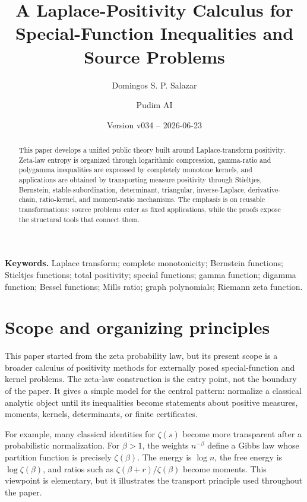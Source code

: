 \documentclass[11pt]{article}
\title{A Laplace-Positivity Calculus for Special-Function Inequalities and Source Problems}
\author{Domingos S. P. Salazar \and Pudim AI}
\date{Version v034 -- 2026-06-23}
\numberwithin{equation}{section}
\theoremstyle{definition}
\theoremstyle{remark}
\newcommand{\1}{\mathbf 1}
\begin{document}
\maketitle

\begin{abstract}
This paper develops a unified public theory built around Laplace-transform
positivity.  Zeta-law entropy is organized through logarithmic compression,
gamma-ratio and polygamma inequalities are expressed by completely monotone
kernels, and applications are obtained by transporting measure positivity
through Stieltjes, Bernstein, stable-subordination, determinant, triangular,
inverse-Laplace, derivative-chain, ratio-kernel, and moment-ratio mechanisms.
The emphasis is on reusable transformations: source problems enter as fixed
applications, while the proofs expose the structural tools that connect them.
\end{abstract}

\tableofcontents

\medskip



\noindent\textbf{Keywords.} Laplace transform; complete monotonicity; Bernstein functions; Stieltjes functions; total positivity; special functions; gamma function; digamma function; Bessel functions; Mills ratio; graph polynomials; Riemann zeta function.

\section{Scope and organizing principles}

This paper started from the zeta probability law, but its present scope is a
broader calculus of positivity methods for externally posed special-function
and kernel problems.  The zeta-law construction is the entry point, not the
boundary of the paper.  It gives a simple model for the central pattern:
normalize a classical analytic object until its inequalities become statements
about positive measures, moments, kernels, determinants, or finite
certificates.

For example, many classical identities for \(\zeta(s)\) become more
transparent after a probabilistic normalization.  For \(\beta>1\), the weights
\(n^{-\beta}\) define a Gibbs law whose partition function is precisely
\(\zeta(\beta)\).  The energy is \(\log n\), the free energy is
\(\log\zeta(\beta)\), and ratios such as
\(\zeta(\beta+r)/\zeta(\beta)\) become moments.  This viewpoint is elementary,
but it illustrates the transport principle used throughout the paper.
\end{document}
